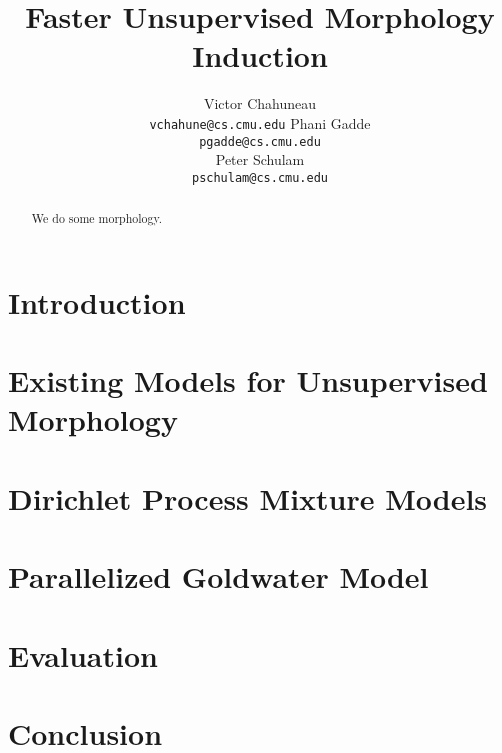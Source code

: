 \documentclass{article}
\title{Faster Unsupervised Morphology Induction}
\author{
Victor Chahuneau\\
\texttt{vchahune@cs.cmu.edu}
\And
Phani Gadde\\
\texttt{pgadde@cs.cmu.edu} \\
\And
Peter Schulam\\
\texttt{pschulam@cs.cmu.edu}
}
\begin{document}
\maketitle

\begin{abstract}
  We do some morphology.
\end{abstract}

\section{Introduction}
\label{sec:introduction}



\section{Existing Models for Unsupervised Morphology}
\label{sec:existing-models}



\section{Dirichlet Process Mixture Models}
\label{sec:dpmm}



\section{Parallelized Goldwater Model}
\label{sec:parallel-goldwater}



\section{Evaluation}
\label{sec:evaluation}



\section{Conclusion}
\label{sec:conclusion}





\end{document}
